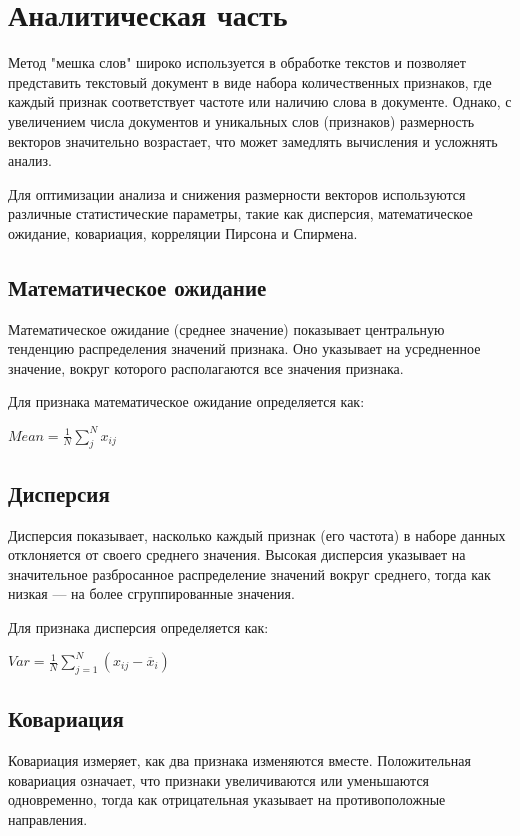 \chapter{Аналитическая часть}

Метод "мешка слов" широко используется в обработке текстов и позволяет представить текстовый документ в виде набора количественных признаков, 
где каждый признак соответствует частоте или наличию слова в документе. 
Однако, с увеличением числа документов и уникальных слов (признаков) размерность векторов значительно возрастает, что может замедлять вычисления и усложнять анализ.

Для оптимизации анализа и снижения размерности векторов используются различные статистические параметры, 
такие как дисперсия, математическое ожидание, ковариация, корреляции Пирсона и Спирмена.

\section{Математическое ожидание}
Математическое ожидание (среднее значение) показывает центральную тенденцию распределения значений признака. 
Оно указывает на усредненное значение, вокруг которого располагаются все значения признака.

Для признака математическое ожидание определяется как:

\begin{math}
    \label{mean}
    Mean = \frac{1}{N}\sum_{j}^{N}x_{ij}
\end{math} \cite{lib:mean}

\section{Дисперсия}
Дисперсия показывает, насколько каждый признак (его частота) в наборе данных отклоняется от своего среднего значения.
Высокая дисперсия указывает на значительное разбросанное распределение значений вокруг среднего, тогда как низкая — на более сгруппированные значения.

Для признака дисперсия определяется как:

\begin{math}
    \label{var}
    Var = \frac{1}{N}\sum_{j = 1}^{N}(x_{ij}-\overline{x}_{i})
\end{math} \cite{lib:var}

\section{Ковариация}
Ковариация измеряет, как два признака изменяются вместе. 
Положительная ковариация означает, что признаки увеличиваются или уменьшаются одновременно, тогда как отрицательная указывает на противоположные направления.

